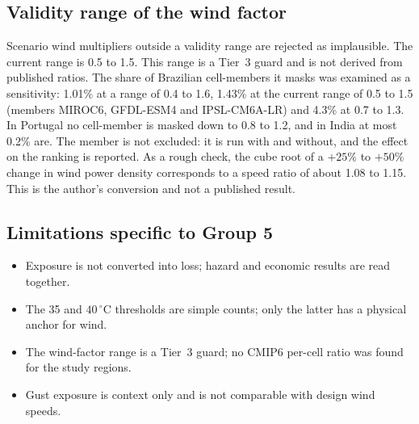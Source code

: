 \subsection{Validity range of the wind factor}
Scenario wind multipliers outside a validity range are rejected as implausible. The current range is 0.5 to 1.5. This range is a Tier~3 guard and is not derived from published ratios. The share of Brazilian cell-members it masks was examined as a sensitivity: 1.01\% at a range of 0.4 to 1.6, 1.43\% at the current range of 0.5 to 1.5 (members MIROC6, GFDL-ESM4 and IPSL-CM6A-LR) and 4.3\% at 0.7 to 1.3. In Portugal no cell-member is masked down to 0.8 to 1.2, and in India at most 0.2\% are. %
The member is not excluded: it is run with and without, and the effect on the ranking is reported. As a rough check, the cube root of a $+25\%$ to $+50\%$ change in wind power density corresponds to a speed ratio of about 1.08 to 1.15. This is the author's conversion and not a published result. %

\subsection{Limitations specific to Group 5}
\begin{itemize}
\item Exposure is not converted into loss; hazard and economic results are read together.
\item The 35 and $40\,^{\circ}\mathrm{C}$ thresholds are simple counts; only the latter has a physical anchor for wind.
\item The wind-factor range is a Tier~3 guard; no CMIP6 per-cell ratio was found for the study regions.
\item Gust exposure is context only and is not comparable with design wind speeds.
\end{itemize}
